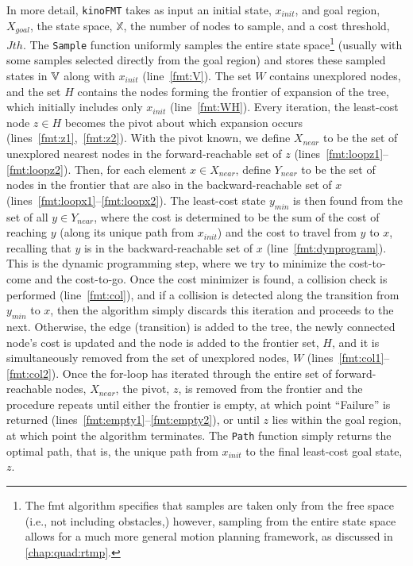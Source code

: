 In more detail, \texttt{kinoFMT} takes as input an initial state, $x_{init}$, and goal region, $X_{goal}$, the state space, $\mathbb{X}$, the number of nodes to sample, and a cost threshold, $Jth$. The \texttt{Sample} function uniformly samples the entire state space\footnote{The \gls{fmt} algorithm specifies that samples are taken only from the free space (i.e., not including obstacles,) however, sampling from the entire state space allows for a much more general motion planning framework, as discussed in \autoref{chap:quad:rtmp}.} (usually with some samples selected directly from the goal region) and stores these sampled states in $\mathbb{V}$ along with $x_{init}$ (line~\ref{fmt:V}). 
The set $W$ contains unexplored nodes, and the set $H$ contains the nodes forming the frontier of expansion of the tree, which initially includes only $x_{init}$ (line~\ref{fmt:WH}). 
Every iteration, the least-cost node $z \in H$ becomes the pivot about which expansion occurs ({lines~\ref{fmt:z1},~\ref{fmt:z2}}). 
With the pivot known, we define $X_{near}$ to be the set of unexplored nearest nodes in the forward-reachable set of $z$ ({lines~\ref{fmt:loopz1}--\ref{fmt:loopz2}}). 
Then, for each element $x \in X_{near}$, define $Y_{near}$ to be the set of nodes in the frontier that are also in the backward-reachable set of $x$ ({lines~\ref{fmt:loopx1}--\ref{fmt:loopx2}}). 
The least-cost state $y_{min}$ is then found from the set of all $y \in Y_{near}$, where the cost is determined to be the sum of the cost of reaching $y$ (along its unique path from $x_{init}$) and the cost to travel from $y$ to $x$, recalling that $y$ is in the backward-reachable set of $x$ (line~\ref{fmt:dynprogram}). This is the dynamic programming step, where we try to minimize the cost-to-come and the cost-to-go. 
Once the cost minimizer is found, a collision check is performed (line~\ref{fmt:col}), and if a collision is detected along the transition from $y_{min}$ to $x$, then the algorithm simply discards this iteration and proceeds to the next. Otherwise, the edge (transition) is added to the tree, the newly connected node's cost is updated and the node is added to the frontier set, $H$, and it is simultaneously removed from the set of unexplored nodes, $W$ ({lines~\ref{fmt:col1}--\ref{fmt:col2}}). 
Once the for-loop has iterated through the entire set of forward-reachable nodes, $X_{near}$, the pivot, $z$, is removed from the frontier and the procedure repeats until either the frontier is empty, at which point ``Failure'' is returned ({lines~\ref{fmt:empty1}--\ref{fmt:empty2}}), or until $z$ lies within the goal region, at which point the algorithm terminates. 
The \texttt{Path} function simply returns the optimal path, that is, the unique path from $x_{init}$ to the final least-cost goal state, $z$.

